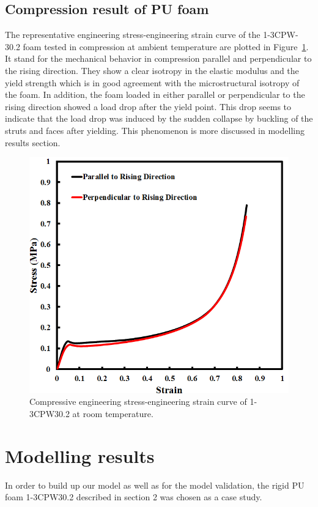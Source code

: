 \documentclass[review]{elsarticle}
\begin{document}
\subsection{Compression result of PU foam}
The representative engineering stress-engineering strain curve of the 1-3CPW- 30.2 foam tested in compression at ambient temperature are plotted in Figure~\ref{fig:StressStrainCurve}. It stand for the mechanical behavior in compression parallel and perpendicular to the rising direction. They show a clear isotropy in the elastic modulus and the yield strength which is in good agreement with the microstructural isotropy of the foam. In addition, the foam loaded in either parallel or perpendicular to the rising direction showed a load drop after the yield point. This drop seems to indicate that the load drop was induced by the sudden collapse by buckling of the struts and faces after yielding. This phenomenon is more discussed in modelling results section.
\begin{figure}[hb]
  \centering
  \includegraphics[scale=0.6]{StressStrainCurve}
  \captionsetup{justification=centering}
  \caption[Close up of \textit{Hemidactylus} sp. ]
   {Compressive engineering stress-engineering strain curve of 1-3CPW30.2 at room temperature.}
  \label{fig:StressStrainCurve}
\end{figure}


\section{Modelling results}
In order to build up our model as well as for the model validation, the rigid PU foam 1-3CPW30.2 described in section 2 was chosen as a case study. 
\end{document}
